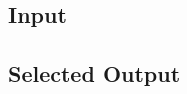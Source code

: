 \subsection{\cM Input}

\begin{singlespacing}
    
\end{singlespacing}

\subsection{Selected \cM Output}\label{sec:rsq}

\begin{singlespacing}
    
\end{singlespacing}